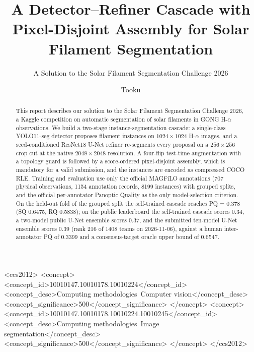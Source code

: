 \documentclass[sigconf]{acmart}
\begin{document}
\title{A Detector--Refiner Cascade with Pixel-Disjoint Assembly for Solar Filament Segmentation}
\subtitle{A Solution to the Solar Filament Segmentation Challenge 2026} %

\author{Tooku}

\begin{abstract}
This report describes our solution to the Solar Filament Segmentation Challenge 2026, a Kaggle competition on automatic segmentation of solar filaments in GONG H-$\alpha$ observations.
We build a two-stage instance-segmentation cascade: a single-class YOLO11-seg detector proposes filament instances on $1024\times1024$ H-$\alpha$ images, and a seed-conditioned ResNet18 U-Net refiner re-segments every proposal on a $256\times256$ crop cut at the native $2048\times2048$ resolution.
A four-flip test-time augmentation with a topology guard is followed by a score-ordered pixel-disjoint assembly, which is mandatory for a valid submission, and the instances are encoded as compressed COCO RLE.
Training and evaluation use only the official MAGFiLO annotations (707 physical observations, 1154 annotation records, 8199 instances) with grouped splits, and the official per-annotator Panoptic Quality as the only model-selection criterion.
On the held-out fold of the grouped split the self-trained cascade reaches PQ = 0.378 (SQ 0.6475, RQ 0.5838); on the public leaderboard the self-trained cascade scores 0.34, a two-model public U-Net ensemble scores 0.37, and the submitted ten-model U-Net ensemble scores 0.39 (rank 216 of 1408 teams on 2026-11-06), against a human inter-annotator PQ of 0.3399 and a consensus-target oracle upper bound of 0.6547.
\end{abstract}


\begin{CCSXML}
<ccs2012>
  <concept>
    <concept_id>10010147.10010178.10010224</concept_id>
    <concept_desc>Computing methodologies~Computer vision</concept_desc>
    <concept_significance>500</concept_significance>
  </concept>
  <concept>
    <concept_id>10010147.10010178.10010224.10010245</concept_id>
    <concept_desc>Computing methodologies~Image segmentation</concept_desc>
    <concept_significance>500</concept_significance>
  </concept>
</ccs2012>
\end{CCSXML}
\end{document}
